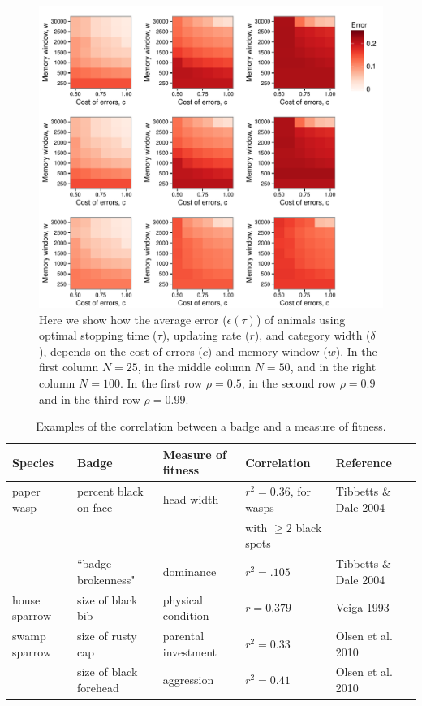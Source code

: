\begin{figure}
\includegraphics[width=6.85in]{figures/error_heat_maps.pdf}
\caption{\sffamily\small\textbf{} Here we show how the average error ($\epsilon(\tau)$) of animals using optimal stopping time ($\tau$), updating rate ($r$), and category width ($\delta$), depends on the cost of errors ($c$) and memory window ($w$). In the first column $N=25$, in the middle column $N=50$, and in the right column $N=100$. In the first  row $\rho=0.5$, in the second row $\rho=0.9$ and in the third row $\rho=0.99$.}
\label{error}
\end{figure}

\begin{table}
\caption{\label{corr_examples} Examples of the correlation between a badge and a measure of fitness.}
\begin{tabular}{lllll}
Species & Badge & Measure of fitness & Correlation & Reference
\\\hline paper wasp & percent black on face & head width & $r^2=0.36$, for wasps  & Tibbetts \& Dale 2004
\\ & & & with $\geq 2$ black spots
\\ & ``badge brokenness" & dominance & $r^2=.105$ & Tibbetts \& Dale 2004
\\ \hline house sparrow & size of black bib & physical condition & $r=0.379$ & Veiga 1993
\\ \hline swamp sparrow & size of rusty cap & parental investment & $r^2=0.33$ & Olsen et al. 2010
\\ & size of black forehead & aggression & $r^2=0.41$ & Olsen et al. 2010
\end{tabular}
\end{table}



